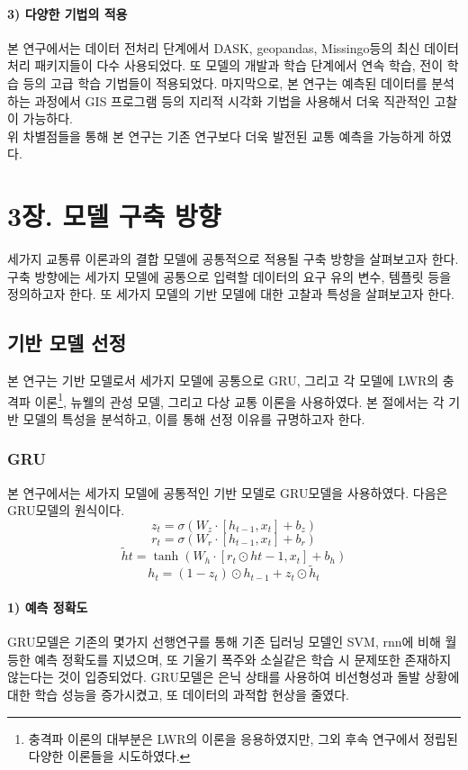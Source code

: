 \documentclass[11pt]{report}
\begin{document}
\subsubsection*{3) 다양한 기법의 적용}
본 연구에서는 데이터 전처리 단계에서 DASK, geopandas, Missingo등의 최신 데이터 처리 패키지들이 다수 사용되었다. 
또 모델의 개발과 학습 단계에서 연속 학습, 전이 학습 등의 고급 학습 기법들이 적용되었다. 
마지막으로, 본 연구는 예측된 데이터를 분석하는 과정에서 GIS 프로그램 등의 지리적 시각화 기법을 사용해서 더욱 직관적인 고찰이 가능하다. \\

\indent 위 차별점들을 통해 본 연구는 기존 연구보다 더욱 발전된 교통 예측을 가능하게 하였다.


\chapter*{3장. 모델 구축 방향}
\setcounter{chapter}{3}
\setcounter{section}{0}
\setcounter{subsection}{0}

세가지 교통류 이론과의 결합 모델에 공통적으로 적용될 구축 방향을 살펴보고자 한다. 
구축 방향에는 세가지 모델에 공통으로 입력할 데이터의 요구 유의 변수, 템플릿 등을 정의하고자 한다. 
또 세가지 모델의 기반 모델에 대한 고찰과 특성을 살펴보고자 한다. 

\section{기반 모델 선정}
본 연구는 기반 모델로서 세가지 모델에 공통으로 GRU, 그리고 각 모델에 LWR의 충격파 이론\footnote{충격파 이론의 대부분은 LWR의 이론을 응용하였지만, 그외 후속 연구에서 정립된 다양한 이론들을 시도하였다.}, 뉴웰의 관성 모델, 그리고 다상 교통 이론을 사용하였다. 
본 절에서는 각 기반 모델의 특성을 분석하고, 이를 통해 선정 이유를 규명하고자 한다. 

\subsection{GRU}
본 연구에서는 세가지 모델에 공통적인 기반 모델로 GRU모델을 사용하였다. 
다음은 GRU모델의 원식이다. 
$$
z_t = \sigma(W_z \cdot [h_{t-1}, x_t] + b_z)
$$
$$
r_t = \sigma(W_r \cdot [h_{t-1}, x_t] + b_r)
$$
$$
\tilde{h}t = \tanh(W_h \cdot [r_t \odot h{t-1}, x_t] + b_h)
$$
$$
h_t = (1 - z_t) \odot h_{t-1} + z_t \odot \tilde{h}_t
$$
\subsubsection*{1) 예측 정확도}
GRU모델은 기존의 몇가지 선행연구를 통해 기존 딥러닝 모델인 SVM, rnn에 비해 월등한 예측 정확도를 지녔으며, 또 기울기 폭주와 소실같은 학습 시 문제또한 존재하지 않는다는 것이 입증되었다. 
GRU모델은 은닉 상태를 사용하여 비선형성과 돌발 상황에 대한 학습 성능을 증가시켰고, 또 데이터의 과적합 현상을 줄였다. 
\end{document}
